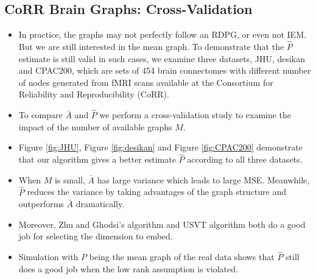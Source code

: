 \documentclass[a4paper]{article}
\begin{document}
\subsection{CoRR Brain Graphs: Cross-Validation}
\begin{itemize}
\item In practice, the graphs may not perfectly follow an RDPG, or even not IEM. But we are still interested in the mean graph. To demonstrate that the $\hat{P}$ estimate is still valid in such cases, we examine three datasets, JHU, desikan and CPAC200, which are sets of 454 brain connectomes with different number of nodes generated from fMRI scans available at the Consortium for Reliability and Reproducibility (CoRR).
\item To compare $\bar{A}$ and $\hat{P}$ we perform a cross-validation study to examine the impact of the number of available graphs $M$.
\item Figure \ref{fig:JHU}, Figure \ref{fig:desikan} and Figure \ref{fig:CPAC200} demonstrate that our algorithm gives a better estimate $\hat{P}$ according to all three datasets. 
\item When $M$ is small, $\bar{A}$ has large variance which leads to large MSE. Meanwhile, $\hat{P}$ reduces the variance by taking advantages of the graph structure and outperforms $\bar{A}$ dramatically.
\item Moreover, Zhu and Ghodsi's algorithm and USVT algorithm both do a good job for selecting the dimension to embed.
\item Simulation with $P$ being the mean graph of the real data shows that $\hat{P}$ still does a good job when the low rank assumption is violated.
\end{itemize}
\end{document}

